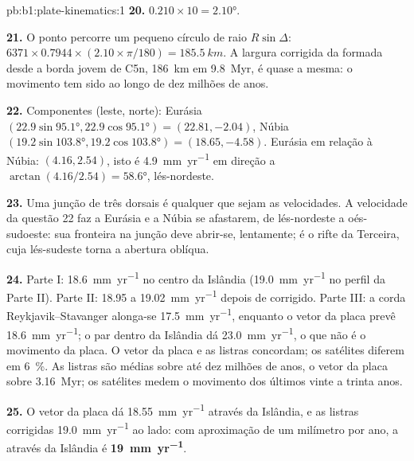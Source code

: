 \begin{solution}{pb:b1:plate-kinematics:1}
\textbf{20.} $0.210\times10 = \ang{2.10}$.

\textbf{21.} O ponto percorre um pequeno círculo de raio $R\sin\Delta$:
$6371\times0.7944\times(2.10\times\pi/180) = \qty{185.5}{km}$. A largura corrigida
da  formada desde a borda jovem de C5n, \qty{186}{km} em
\qty{9.8}{Myr}, é quase a mesma: o movimento tem sido  ao longo de dez
milhões de anos.

\textbf{22.} Componentes (leste, norte): Eurásia
$(22.9\sin\ang{95.1}, 22.9\cos\ang{95.1}) = (22.81, -2.04)$, Núbia
$(19.2\sin\ang{103.8}, 19.2\cos\ang{103.8}) = (18.65, -4.58)$. Eurásia em relação
à Núbia: $(4.16, 2.54)$, isto é \qty{4.9}{mm.yr^{-1}} em direção a
$\arctan(4.16/2.54) = \ang{58.6}$, lés-nordeste.

\textbf{23.} Uma junção de três dorsais é  qualquer que sejam as velocidades. A
velocidade da questão 22 faz a Eurásia e a Núbia se afastarem, de lés-nordeste a
oés-sudoeste: sua fronteira na junção deve abrir-se, lentamente; é o
rifte da Terceira, cuja  lés-sudeste torna a abertura oblíqua.

\textbf{24.} Parte I: \qty{18.6}{mm.yr^{-1}} no centro da Islândia
(\qty{19.0}{mm.yr^{-1}} no perfil da Parte II). Parte II: 18.95 a
\qty{19.02}{mm.yr^{-1}} depois de corrigido. Parte III: a corda Reykjavik--Stavanger
alonga-se \qty{17.5}{mm.yr^{-1}}, enquanto o vetor da placa prevê
\qty{18.6}{mm.yr^{-1}}; o par dentro da Islândia dá \qty{23.0}{mm.yr^{-1}},
o que não é o movimento da placa. O vetor da placa e as listras concordam; os
satélites diferem em \qty{6}{\percent}. As listras são médias sobre até dez
milhões de anos, o vetor da placa sobre \qty{3.16}{Myr}; os satélites medem
o movimento dos últimos vinte a trinta anos.

\textbf{25.} O vetor da placa dá \qty{18.55}{mm.yr^{-1}} através da Islândia, e
as listras corrigidas \qty{19.0}{mm.yr^{-1}} ao lado: com aproximação de um
milímetro por ano, a  através da Islândia é
\textbf{\qty[text-series-to-math=true]{19}{mm.yr^{-1}}}.
\end{solution}
